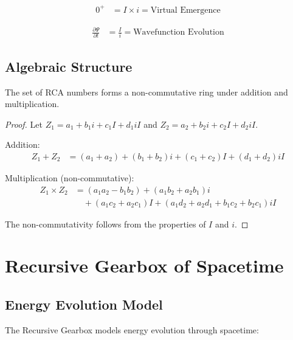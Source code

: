 \documentclass[12pt,a4paper]{article}
\begin{document}
\begin{definition}
\begin{align}
0^+ &= I \times i = \text{Virtual Emergence}
\end{align}
\end{definition}

\begin{definition}
\begin{align}
\frac{\partial \Psi}{\partial t} &= \frac{I}{i} = \text{Wavefunction Evolution}
\end{align}
\end{definition}

\subsection{Algebraic Structure}

\begin{theorem}
The set of RCA numbers forms a non-commutative ring under addition and multiplication.
\end{theorem}

\begin{proof}
Let $Z_1 = a_1 + b_1i + c_1I + d_1iI$ and $Z_2 = a_2 + b_2i + c_2I + d_2iI$.

Addition:
\begin{align}
Z_1 + Z_2 &= (a_1 + a_2) + (b_1 + b_2)i + (c_1 + c_2)I + (d_1 + d_2)iI
\end{align}

Multiplication (non-commutative):
\begin{align}
Z_1 \times Z_2 &= (a_1a_2 - b_1b_2) + (a_1b_2 + a_2b_1)i \\
&\quad + (a_1c_2 + a_2c_1)I + (a_1d_2 + a_2d_1 + b_1c_2 + b_2c_1)iI
\end{align}

The non-commutativity follows from the properties of $I$ and $i$.
\end{proof}

\section{Recursive Gearbox of Spacetime}

\subsection{Energy Evolution Model}

The Recursive Gearbox models energy evolution through spacetime:
\end{document}
